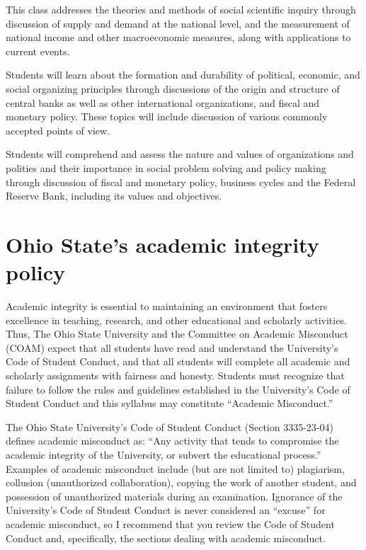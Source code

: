 \documentclass[12pt]{article}
\begin{document}
This class addresses the theories and methods of social scientific inquiry through discussion of supply and demand at the national level, and the measurement of national income and other macroeconomic measures, along with applications to current events.

Students will learn about the formation and durability of political, economic, and social organizing principles through discussions of the origin and structure of central banks as well as other international organizations, and fiscal and monetary policy. These topics will include discussion of various commonly accepted points of view.

Students will comprehend and assess the nature and values of organizations and polities and their importance in social problem solving and policy making through discussion of fiscal and monetary policy, business cycles and the Federal Reserve Bank, including its values and objectives.



\newpage

\section*{Ohio State’s academic integrity policy}

Academic integrity is essential to maintaining an environment that fosters excellence in teaching, research, and other educational and scholarly activities.
Thus, The Ohio State University and the Committee on Academic Misconduct (COAM) expect that all students have read and understand the University’s Code of Student Conduct, and that all students will complete all academic and scholarly assignments with fairness and honesty.
Students must recognize that failure to follow the rules and guidelines established in the University’s Code of Student Conduct and this syllabus may constitute ``Academic Misconduct.''

The Ohio State University’s Code of Student Conduct (Section 3335-23-04) defines academic misconduct as: ``Any activity that tends to compromise the academic integrity of the University, or subvert the educational process.''
Examples of academic misconduct include (but are not limited to) plagiarism, collusion (unauthorized collaboration), copying the work of another student, and possession of unauthorized materials during an examination.
Ignorance of the University’s Code of Student Conduct is never considered an ``excuse'' for academic misconduct, so I recommend that you review the Code of Student Conduct and, specifically, the sections dealing with academic misconduct.
\end{document}
